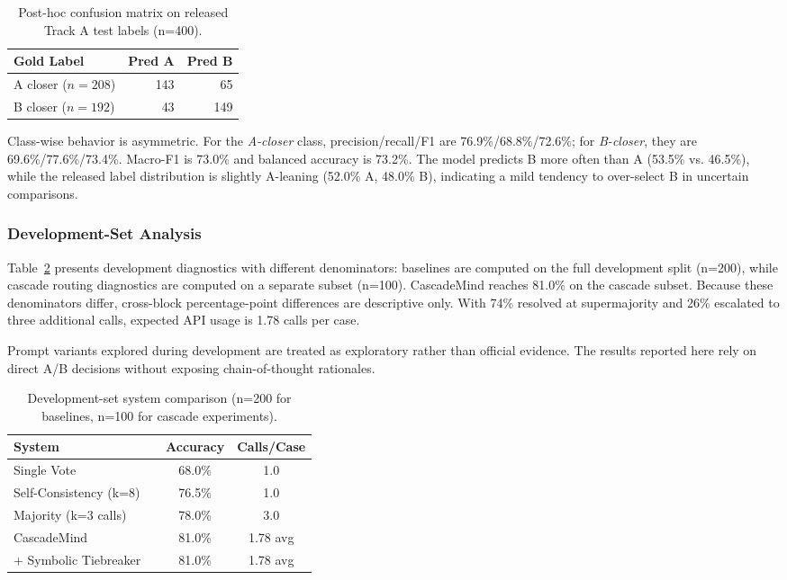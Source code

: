 \documentclass[11pt]{article}
\begin{document}
\begin{table}[t]
\centering
\small
\begin{tabular}{lrr}
\toprule
\textbf{Gold Label} & \textbf{Pred A} & \textbf{Pred B} \\
\midrule
A closer ($n{=}208$) & 143 & 65 \\
B closer ($n{=}192$) & 43 & 149 \\
\bottomrule
\end{tabular}
\caption{Post-hoc confusion matrix on released Track A test labels (n=400).}
\label{tab:test_confusion}
\end{table}

Class-wise behavior is asymmetric. For the \emph{A-closer} class, precision/recall/F1 are 76.9\%/68.8\%/72.6\%; for \emph{B-closer}, they are 69.6\%/77.6\%/73.4\%. Macro-F1 is 73.0\% and balanced accuracy is 73.2\%. The model predicts B more often than A (53.5\% vs. 46.5\%), while the released label distribution is slightly A-leaning (52.0\% A, 48.0\% B), indicating a mild tendency to over-select B in uncertain comparisons.

\subsubsection{Development-Set Analysis}
Table~\ref{tab:dev_results} presents development diagnostics with different denominators: baselines are computed on the full development split (n=200), while cascade routing diagnostics are computed on a separate subset (n=100). CascadeMind reaches 81.0\% on the cascade subset. Because these denominators differ, cross-block percentage-point differences are descriptive only. With 74\% resolved at supermajority and 26\% escalated to three additional calls, expected API usage is 1.78 calls per case.

Prompt variants explored during development are treated as exploratory rather than official evidence. The results reported here rely on direct A/B decisions without exposing chain-of-thought rationales.

\begin{table}[t]
\centering
\footnotesize
\begin{tabular}{@{}p{0.50\linewidth}cc@{}}
\toprule
\textbf{System} & \textbf{Accuracy} & \textbf{Calls/Case} \\
\midrule
Single Vote & 68.0\% & 1.0 \\
Self-Consistency (k=8) & 76.5\% & 1.0 \\
Majority (k=3 calls) & 78.0\% & 3.0 \\
\midrule
CascadeMind & 81.0\% & 1.78 avg \\
\quad + Symbolic Tiebreaker & 81.0\% & 1.78 avg \\
\bottomrule
\end{tabular}
\caption{Development-set system comparison (n=200 for baselines, n=100 for cascade experiments).}
\label{tab:dev_results}
\end{table}
\end{document}
